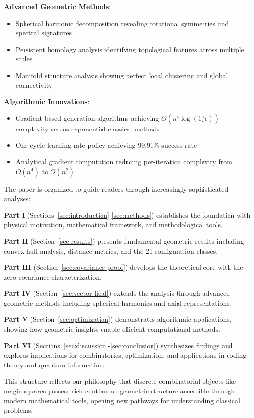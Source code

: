\textbf{Advanced Geometric Methods}:
\begin{itemize}
    \item Spherical harmonic decomposition revealing rotational symmetries and spectral signatures
    \item Persistent homology analysis identifying topological features across multiple scales
    \item Manifold structure analysis showing perfect local clustering and global connectivity
\end{itemize}

\textbf{Algorithmic Innovations}:
\begin{itemize}
    \item Gradient-based generation algorithms achieving $O(n^4 \log(1/\epsilon))$ complexity versus exponential classical methods
    \item One-cycle learning rate policy achieving 99.91\% success rate
    \item Analytical gradient computation reducing per-iteration complexity from $O(n^4)$ to $O(n^2)$
\end{itemize}

The paper is organized to guide readers through increasingly sophisticated analyses:

\textbf{Part I} (Sections~\ref{sec:introduction}-\ref{sec:methods}) establishes the foundation with physical motivation, mathematical framework, and methodological tools.

\textbf{Part II} (Section~\ref{sec:results}) presents fundamental geometric results including convex hull analysis, distance metrics, and the 21 configuration classes.

\textbf{Part III} (Section~\ref{sec:covariance-proof}) develops the theoretical core with the zero-covariance characterization.

\textbf{Part IV} (Section~\ref{sec:vector-field}) extends the analysis through advanced geometric methods including spherical harmonics and axial representations.

\textbf{Part V} (Section~\ref{sec:optimization}) demonstrates algorithmic applications, showing how geometric insights enable efficient computational methods.

\textbf{Part VI} (Sections~\ref{sec:discussion}-\ref{sec:conclusion}) synthesizes findings and explores implications for combinatorics, optimization, and applications in coding theory and quantum information.

This structure reflects our philosophy that discrete combinatorial objects like magic squares possess rich continuous geometric structure accessible through modern mathematical tools, opening new pathways for understanding classical problems. 